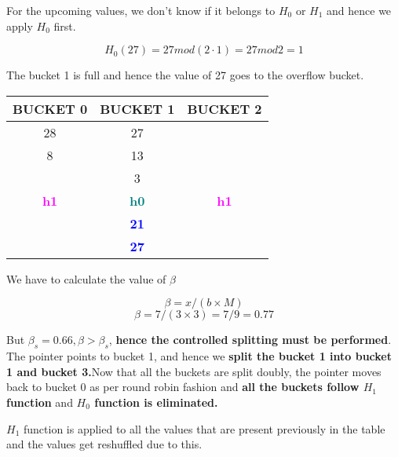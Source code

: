For the upcoming values, we don't know if it belongs to $H_0$ or $H_1$ and hence we apply ${H_0}$ first.

\[H_0(27) = 27 mod (2 \cdot 1)  = 27 mod 2 = 1\] 

The bucket 1 is full and hence the value of 27 goes to the overflow bucket.

\begin{center}
\begin{tabular}{ |c|c|c| } 
 \hline
 BUCKET 0 & \textbf{\color{red}{P}} BUCKET 1 & BUCKET 2\\ [0.5ex] 
 \hline\hline
 \hline
  28 & 27 & \\ 
   8 & 13 & \\
   & 3 & \\
 \hline
 \hline
\textbf{\textcolor{magenta}{h1}} & \textbf{\textcolor{teal}{h0}}& \textbf{\textcolor{magenta}{h1}}\\ [0.5ex] 
 \hline
     & \textbf{\textcolor{blue}{21}}\\ 
     & \textbf{\textcolor{blue}{27}}
\end{tabular}
\end{center}

We have to calculate the value of $\beta$

\[\beta = x/(b \times M)\]
\[\beta = 7/(3 \times 3) = 7/9 = 0.77\]

But $\beta_s = 0.66 , \beta>\beta_s$,\textbf{ hence the controlled splitting must be performed}. The pointer points to bucket 1, and hence we \textbf{split the bucket 1 into bucket 1 and bucket 3.}Now that all the buckets are split doubly, the pointer moves back to bucket 0 as per round robin fashion and \textbf{all the buckets follow $H_1$ function} and \textbf{$H_0$ function is eliminated.}


\newpage

$H_1$ function is applied to all the values that are present previously in the table and the values get reshuffled due to this.

